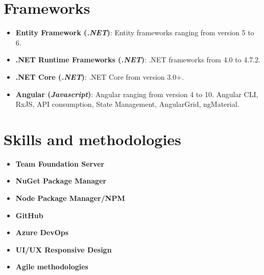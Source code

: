 \documentclass[letterpaper,11pt]{article}
\newcommand{\resumeItemItalic}[3]{
  \item\small{
    \textbf{#1 (\textit{#2})}{: #3 \vspace{-2pt}}
  }\vspace{-4pt}
}
\newcommand{\resumeItemAlign}[2]{
  \vspace{-1pt}\item\small{
    \textbf{#1} \hfill \textit{#2}
  }\vspace{-5pt}
}
\newcommand{\resumeSubHeadingListStart}{\begin{itemize}[leftmargin=*]}
\newcommand{\resumeSubHeadingListEnd}{\end{itemize}}
\begin{document}
\section{Frameworks}
\resumeSubHeadingListStart
  \resumeItemItalic{Entity Framework} {.NET}
    {Entity frameworks ranging from version 5 to 6.}
  \resumeItemItalic{.NET Runtime Frameworks}{.NET}
    {.NET frameworks from 4.0 to 4.7.2.}
\resumeItemItalic{.NET Core}{.NET}
    {.NET Core from version 3.0+.}
  \resumeItemItalic{Angular}{Javascript}
    {Angular ranging from version 4 to 10. Angular CLI, RxJS, API consumption, State Management, AngularGrid, ngMaterial.}
\resumeSubHeadingListEnd


\section{Skills and methodologies}

\resumeSubHeadingListStart
	\resumeItemAlign{Team Foundation Server}{}
	\resumeItemAlign{NuGet Package Manager}{}
	\resumeItemAlign{Node Package Manager/NPM}{}
	\resumeItemAlign{GitHub}{}
	\resumeItemAlign{Azure DevOps}{}
	\resumeItemAlign{UI/UX Responsive Design}{}
	\resumeItemAlign{Agile methodologies}{}
\resumeSubHeadingListEnd
\end{document}
